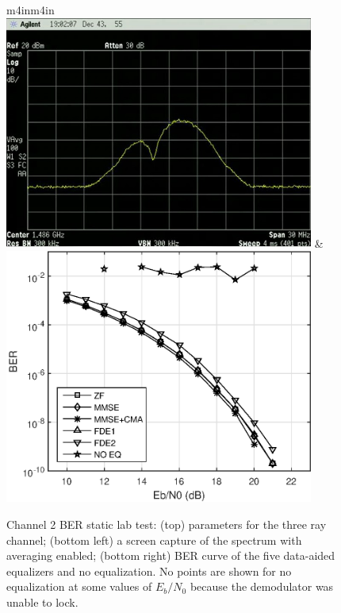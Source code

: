 \begin{figure}
\begin{center}
\begin{tabular}{m{4in}m{4in}}
\\[54pt]
\includegraphics[width=4in]{figures/eq_GPUimplementation/BER2.jpg}
&
\includegraphics[width=4in]{figures/eq_GPUimplementation/BER2.eps}
\end{tabular}
\end{center}
\caption{Channel 2 BER static lab test:
(top) parameters for the three ray channel;
(bottom left) a screen capture of the spectrum with averaging enabled;
(bottom right) BER curve of the five data-aided equalizers and no equalization.
No points are shown for no equalization at some values of $E_b/N_0$ because the demodulator was unable to lock.}
\label{fig:BER2}
\end{figure}

